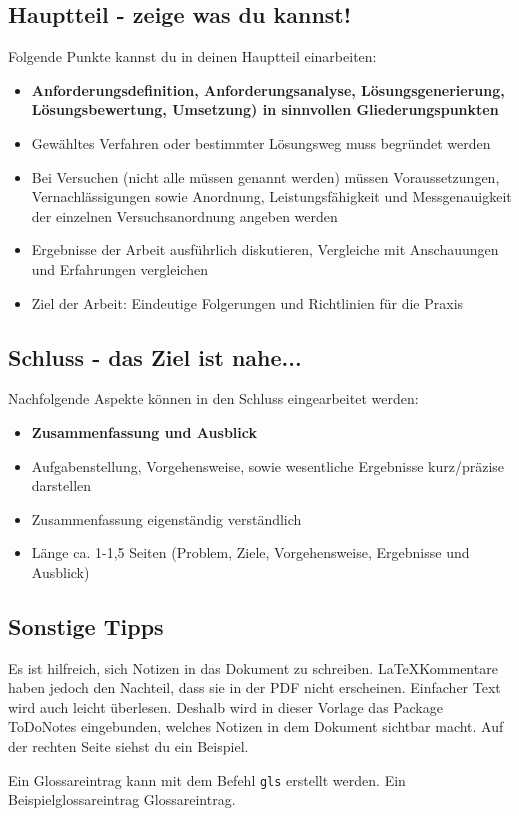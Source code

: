 \subsection{Hauptteil - zeige was du kannst!}
Folgende Punkte kannst du in deinen Hauptteil einarbeiten:
\begin{itemize}
\item \textbf{Anforderungsdefinition, Anforderungsanalyse, Lösungsgenerierung, Lösungsbewertung, Umsetzung) in sinnvollen Gliederungspunkten}
\item Gewähltes Verfahren oder bestimmter Lösungsweg muss begründet werden
\item Bei Versuchen (nicht alle müssen genannt werden) müssen Voraussetzungen, Vernachlässigungen sowie Anordnung, Leistungsfähigkeit und Messgenauigkeit der einzelnen Versuchsanordnung angeben werden
\item Ergebnisse der Arbeit ausführlich diskutieren, Vergleiche mit Anschauungen und Erfahrungen vergleichen
\item Ziel der Arbeit: Eindeutige Folgerungen und Richtlinien für die Praxis
\end{itemize}

\subsection{Schluss - das Ziel ist nahe...}
Nachfolgende Aspekte können in den Schluss eingearbeitet werden:
\begin{itemize}
\item \textbf{Zusammenfassung und Ausblick}
\item Aufgabenstellung, Vorgehensweise, sowie wesentliche Ergebnisse kurz/präzise darstellen
\item Zusammenfassung eigenständig verständlich
\item Länge ca. 1-1,5 Seiten (Problem, Ziele, Vorgehensweise, Ergebnisse und Ausblick)
\end{itemize}

\subsection{Sonstige Tipps}
Es ist hilfreich, sich Notizen in das Dokument zu schreiben.
\LaTeX Kommentare haben jedoch den Nachteil, dass sie in der PDF nicht erscheinen.
Einfacher Text wird auch leicht überlesen.
Deshalb wird in dieser Vorlage das Package ToDoNotes eingebunden, welches Notizen in dem Dokument sichtbar macht.
Auf der rechten Seite siehst du ein Beispiel.

Ein Glossareintrag kann mit dem Befehl \texttt{gls} erstellt werden. Ein Beispielglossareintrag \gls{Glossareintrag}.
